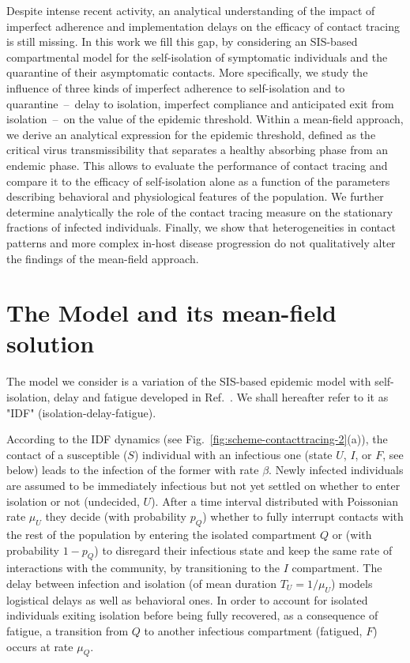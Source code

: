 \documentclass[aps,twocolumn,superscriptaddress,nofootinbib,pre,floatfix]{revtex4-1}
\begin{document}
Despite intense recent activity, an analytical understanding of the
impact of imperfect adherence and implementation delays on the
efficacy of contact tracing is still missing. In this work
we fill this gap, by considering an
SIS-based compartmental model for the self-isolation of symptomatic
individuals and the quarantine of their asymptomatic contacts. More
specifically, we study the influence of three kinds of imperfect
adherence to self-isolation and to quarantine~--~delay to isolation,
imperfect compliance and anticipated exit from isolation~--~on the value
of the epidemic threshold.
Within a mean-field approach, we derive an analytical expression
for the epidemic threshold, defined as the critical virus
transmissibility that separates a healthy absorbing phase from an
endemic phase. This allows to evaluate the performance of
contact tracing and compare it to the efficacy of self-isolation
alone as a function of the parameters describing behavioral and
physiological features of the population.
We further determine analytically the role of
the contact tracing measure on the stationary fractions of infected
individuals.
Finally, we show that heterogeneities in contact patterns and
more complex in-host disease progression do not qualitatively
alter the findings of the mean-field approach.

\section{The Model and its mean-field solution}

The model we consider is a variation of the SIS-based epidemic model
with self-isolation, delay and fatigue developed in Ref.~\cite{QDF}. We
shall hereafter refer to it as "IDF" (isolation-delay-fatigue).

According to the IDF dynamics (see Fig.~\ref{fig:scheme-contacttracing-2}(a)),
the contact of a susceptible ($S$)
individual with an infectious one (state $U$, $I$, or $F$, see below)
leads to the infection of the former
with rate $\beta$. Newly infected individuals are assumed to be
immediately infectious but not yet settled on whether to enter
isolation or not (undecided, $U$). After a time interval distributed with
Poissonian rate $\mu_U$ they decide (with probability $p_Q$)
whether to fully interrupt contacts with the rest of the population by
entering the isolated compartment $Q$ or (with probability $1-p_Q$)
to disregard their infectious state
and keep the same rate of interactions with the community, by transitioning
to the $I$ compartment.
The delay between infection and isolation (of mean duration $T_U=1/\mu_U$)
models logistical delays as well as behavioral ones.
In order to account for isolated individuals exiting isolation
before being fully recovered, as a consequence of fatigue, 
a transition from $Q$ to another infectious compartment (fatigued, $F$) occurs
at rate $\mu_Q$.
\end{document}
